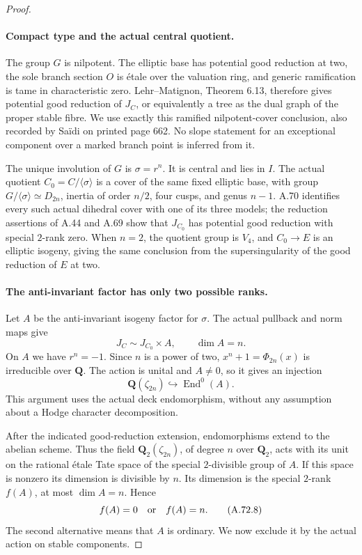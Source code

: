 \begin{proof}
\paragraph{Compact type and the actual central quotient.}
The group \(G\) is nilpotent. The elliptic base has potential
good reduction at two, the sole branch section \(O\) is
\'{e}tale over the valuation ring, and generic ramification is
tame in characteristic zero. Lehr--Matignon, Theorem 6.13,
therefore gives potential good reduction of \(J_C\), or
equivalently a tree as the dual graph of the proper stable
fibre. We use exactly this ramified nilpotent-cover conclusion,
also recorded by Sa\"idi on printed page 662.
\cite{fghLehrMatignon2005,fghSaidi2007}
No slope statement for an exceptional component over a marked
branch point is inferred from it.

The unique involution of \(G\) is
\(\sigma=r^n\). It is central and lies in \(I\).
The actual quotient \(C_0=C/\langle\sigma\rangle\) is a
cover of the same fixed elliptic base, with group
\(G/\langle\sigma\rangle\simeq D_{2n}\), inertia of order
\(n/2\), four cusps, and genus \(n-1\). A.70 identifies
every such actual dihedral cover with one of its three models;
the reduction assertions of A.44 and A.69 show that
\(J_{C_0}\) has potential good reduction with special
\(2\)-rank zero. When \(n=2\), the quotient group is
\(V_4\), and \(C_0\to E\) is an elliptic isogeny, giving
the same conclusion from the supersingularity of the good
reduction of \(E\) at two.

\paragraph{The anti-invariant factor has only two possible ranks.}
Let \(A\) be the anti-invariant isogeny factor for \(\sigma\).
The actual pullback and norm maps give
\[
             J_C\sim J_{C_0}\times A,
             \qquad \dim A=n.                    \tag{A.72.6}
\]
On \(A\) we have \(r^n=-1\). Since \(n\) is a power of
two, \(x^n+1=\Phi_{2n}(x)\) is irreducible over \(\mathbf Q\).
The action is unital and \(A\ne0\), so it gives an injection
\[
             \mathbf Q(\zeta_{2n})
                       \hookrightarrow\operatorname{End}^0(A).
                                                        \tag{A.72.7}
\]
This argument uses the actual deck endomorphism, without any
assumption about a Hodge character decomposition.

After the indicated good-reduction extension, endomorphisms
extend to the abelian scheme. Thus the field
\(\mathbf Q_2(\zeta_{2n})\), of degree \(n\) over
\(\mathbf Q_2\), acts with its unit on the rational \'{e}tale
Tate space of the special \(2\)-divisible group of \(A\).
If this space is nonzero its dimension is divisible by \(n\).
Its dimension is the special \(2\)-rank \(f(A)\), at most
\(\dim A=n\). Hence
\[
                    f(A)=0\quad\hbox{or}\quad f(A)=n.
                                                        \tag{A.72.8}
\]
The second alternative means that \(A\) is ordinary. We now
exclude it by the actual action on stable components.


\end{proof}

